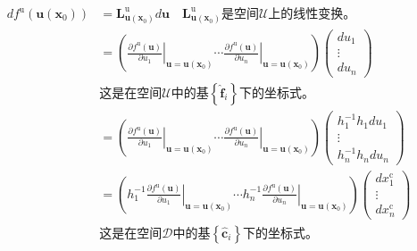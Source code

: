 \documentclass[../main.tex]{subfiles}
\begin{document}
\begin{align*}
    df^\mathrm{u}\left(\mathbf{u}\left(\mathbf{x}_0\right)\right) & =\mathbf{L}_{\mathbf{u}\left(\mathbf{x}_0\right)}^\mathrm{u}d\mathbf{u}\quad\text{$\mathbf{L}_{\mathbf{u}\left(\mathbf{x}_0\right)}^\mathrm{u}$是空间$\mathcal{U}$上的线性变换。}                                                                                                                                                                                                             \\
                                                                  & =\left(\left.\frac{\partial f^\mathrm{u}\left(\mathbf{u}\right)}{\partial u_1}\right|_{\mathbf{u}=\mathbf{u}\left(\mathbf{x}_0\right)}\cdots\left.\frac{\partial f^\mathrm{u}\left(\mathbf{u}\right)}{\partial u_n}\right|_{\mathbf{u}=\mathbf{u}\left(\mathbf{x}_0\right)}\right)\left(\begin{array}{c}du_1\\\vdots\\du_n\end{array}\right)                                        \\
                                                                  & \text{这是在空间$\mathcal{U}$中的基$\left\{\mathbf{\hat{f}}_i\right\}$下的坐标式。}                                                                                                                                                                                                                                                                                                               \\
                                                                  & =\left(\left.\frac{\partial f^\mathrm{u}\left(\mathbf{u}\right)}{\partial u_1}\right|_{\mathbf{u}=\mathbf{u}\left(\mathbf{x}_0\right)}\cdots\left.\frac{\partial f^\mathrm{u}\left(\mathbf{u}\right)}{\partial u_n}\right|_{\mathbf{u}=\mathbf{u}\left(\mathbf{x}_0\right)}\right)\left(\begin{array}{c}h_1^{-1}h_1du_1\\\vdots\\h_n^{-1}h_ndu_n\end{array}\right)                  \\
                                                                  & =\left(h_1^{-1}\left.\frac{\partial f^\mathrm{u}\left(\mathbf{u}\right)}{\partial u_1}\right|_{\mathbf{u}=\mathbf{u}\left(\mathbf{x}_0\right)}\cdots h_n^{-1}\left.\frac{\partial f^\mathrm{u}\left(\mathbf{u}\right)}{\partial u_n}\right|_{\mathbf{u}=\mathbf{u}\left(\mathbf{x}_0\right)}\right)\left(\begin{array}{c}dx_1^\mathrm{c}\\\vdots\\dx_n^\mathrm{c}\end{array}\right) \\
                                                                  & \text{这是在空间$\mathcal{D}$中的基$\left\{\mathbf{\hat{c}}_i\right\}$下的坐标式。}
\end{align*}
\end{document}
